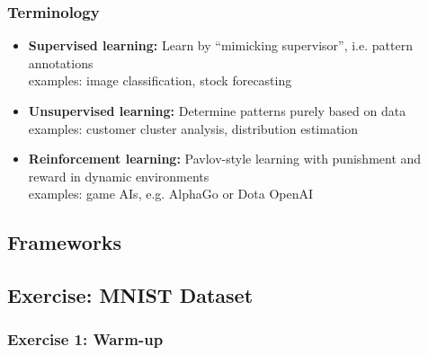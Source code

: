 \documentclass[aspectratio=169]{beamer}
\begin{document}
\begin{frame}
\frametitle{Terminology}
    \begin{itemize}
        \item \textbf{Supervised learning:} Learn by ``mimicking supervisor'', i.e. pattern annotations\\ 
        examples: image classification, stock forecasting
        \item \textbf{Unsupervised learning:} Determine patterns purely based on data\\ examples: customer cluster analysis, distribution estimation
        \item \textbf{Reinforcement learning:} Pavlov-style learning with punishment and reward in dynamic environments\\
        examples: game AIs, e.g. AlphaGo or Dota OpenAI
    \end{itemize}

    \medskip
\end{frame}


\subsection{Frameworks}

\subsection{Exercise: MNIST Dataset}

\begin{frame}
    \frametitle{Exercise 1: Warm-up}
    \begin{figure}
        \centering
    \end{figure}
\end{frame}
\end{document}
